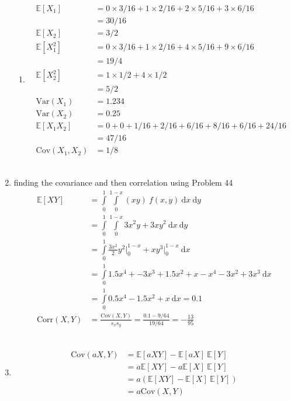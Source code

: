 \begin{enumerate}
\begin{enumerate}
			\item \begin{align}
				\mathbb{E}[X_1] &= 0 \times 3/16 + 1 \times 2/16 + 2 \times 5/16 + 3 \times 6/16 \nonumber \\
				&= 30/16 \\
				\mathbb{E}[X_2] &= 3/2 \\
				\mathbb{E}[X_1^2] &= 0 \times 3/16 + 1 \times 2/16 + 4 \times 5/16 + 9 \times 6/16 \nonumber \\
				&= 19/4 \\
				\mathbb{E}[X_2^2] &= 1 \times 1/2 + 4 \times 1/2 \nonumber \\
				&= 5/2 \\
				\mathrm{Var}(X_1) &= 1.234 \\
				\mathrm{Var}(X_2) &= 0.25 \\
				\mathbb{E}[X_1 X_2] &= 0 + 0 + 1/16 + 2/16 + 6/16 + 8/16 + 6/16 + 24/16  \nonumber \\
				&= 47/16 \\
				\mathrm{Cov}(X_1, X_2) &= 1/8 
			\end{align} \\
		\end{enumerate}
	
	
	\item finding the covariance and then correlation using Problem 44 \\ 
	
		\begin{align}
			\mathbb{E}[XY] &= \int\limits_{0}^{1} \int\limits_{0}^{1-x}  (xy) \ f(x, y) \ \mathrm{d}x \ \mathrm{d}y \nonumber \\
			&= \int\limits_{0}^{1} \int\limits_{0}^{1-x}  3x^2 y + 3x y^2 \ \mathrm{d}x \ \mathrm{d}y \nonumber \\
			&= \int\limits_{0}^{1}  \frac{3x^2}{2} y^2 \Big|_0^{1-x} + x y^3 \Big|_0^{1-x} \ \mathrm{d}x \nonumber \\
			&= \int\limits_{0}^{1}  1.5x^4 + -3x^3 + 1.5x^2 + x - x^4 - 3x^2 + 3x^3  \ \mathrm{d}x \nonumber \\
			&= \int\limits_{0}^{1}  0.5x^4 - 1.5x^2 + x \ \mathrm{d}x \nonumber = 0.1 \\
			\mathrm{Corr}(X, Y) &= \frac{\mathrm{Cov}(X, Y)}{s_x s_y} = \frac{0.1 - 9/64}{19/64} = -\frac{13}{95}
		\end{align} \\
	
	
	\item 
		\begin{align}
			\mathrm{Cov}(aX, Y) &= \mathbb{E}[aXY] - \mathbb{E}[aX] \ \mathbb{E}[Y] \nonumber \\
			&= a \mathbb{E}[XY] - a\mathbb{E}[X] \ \mathbb{E}[Y] \nonumber \\
			&= a \left(\mathbb{E}[XY] - \mathbb{E}[X] \ \mathbb{E}[Y]\right) \nonumber \\
			&= a \mathrm{Cov}(X, Y)
		\end{align} \\
	

\end{enumerate}

